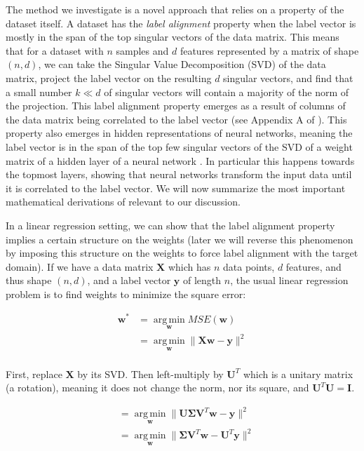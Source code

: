 \documentclass[twoside,11pt]{article}
\begin{document}
The method we investigate is a novel approach that relies on a property of the dataset itself. A dataset has the \emph{label alignment} property when the label vector is mostly in the span of the top singular vectors of the data matrix. This means that for a dataset with $n$ samples and $d$ features represented by a matrix of shape $(n, d)$, we can take the Singular Value Decomposition (SVD) of the data matrix, project the label vector on the resulting $d$ singular vectors, and find that a small number $k \ll d$ of singular vectors will contain a majority of the norm of the projection. This label alignment property emerges as a result of columns of the data matrix being correlated to the label vector (see Appendix A of \cite{imani2022label}). This property also emerges in hidden representations of neural networks, meaning the label vector is in the span of the top few singular vectors of the SVD of a weight matrix of a hidden layer of a neural network \cite{imani2022representation}. In particular this happens towards the topmost layers, showing that neural networks transform the input data until it is correlated to the label vector. We will now summarize the most important mathematical derivations of \cite{imani2022label} relevant to our discussion.

In a linear regression setting, we can show that the label alignment property implies a certain structure on the weights (later we will reverse this phenomenon by imposing this structure on the weights to force label alignment with the target domain). If we have a data matrix $\mathbf{X}$ which has $n$ data points, $d$ features, and thus shape $(n,d)$, and a label vector $\mathbf{y}$ of length $n$, the usual linear regression problem is to find weights to minimize the square error:

$$
\begin{aligned}
\mathbf{w}^* &= \operatorname*{arg\,min}_{\mathbf{w}} MSE(\mathbf{w}) \\
&= \operatorname*{arg\,min}_{\mathbf{w}} \lVert \mathbf{X} \mathbf{w} - \mathbf{y} \rVert^2 \\
\end{aligned}
$$

First, replace $\mathbf{X}$ by its SVD. Then left-multiply by $\mathbf{U}^T$ which is a unitary matrix (a rotation), meaning it does not change the norm, nor its square, and $\mathbf{U}^T \mathbf{U} = \mathbf{I}$. 

$$
\begin{aligned}
&= \operatorname*{arg\,min}_{\mathbf{w}} \lVert \mathbf{U \Sigma V}^T \mathbf{w} - \mathbf{y} \rVert^2 \\
&= \operatorname*{arg\,min}_{\mathbf{w}} \lVert \mathbf{\Sigma V}^T \mathbf{w} - \mathbf{U}^T \mathbf{y} \rVert^2 \\
\end{aligned}
$$
\end{document}

